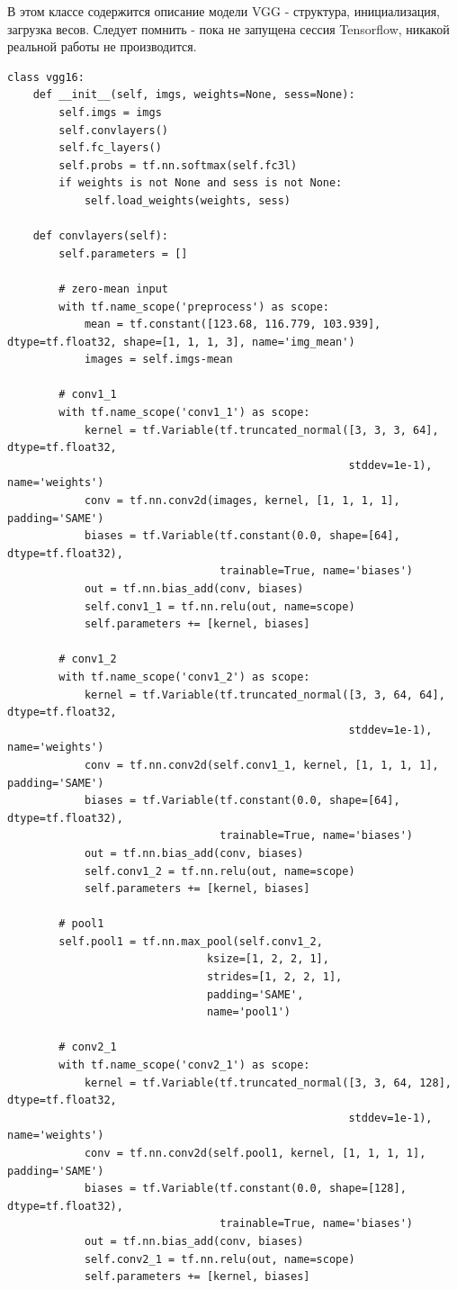 \documentclass[11pt,a4paper]{article}
\begin{document}
В этом классе содержится описание модели VGG - структура, инициализация, загрузка весов. Следует помнить - пока не запущена сессия Tensorflow, никакой реальной работы не производится.

\begin{verbatim}
class vgg16:
    def __init__(self, imgs, weights=None, sess=None):
        self.imgs = imgs
        self.convlayers()
        self.fc_layers()
        self.probs = tf.nn.softmax(self.fc3l)
        if weights is not None and sess is not None:
            self.load_weights(weights, sess)

    def convlayers(self):
        self.parameters = []

        # zero-mean input
        with tf.name_scope('preprocess') as scope:
            mean = tf.constant([123.68, 116.779, 103.939], dtype=tf.float32, shape=[1, 1, 1, 3], name='img_mean')
            images = self.imgs-mean

        # conv1_1
        with tf.name_scope('conv1_1') as scope:
            kernel = tf.Variable(tf.truncated_normal([3, 3, 3, 64], dtype=tf.float32,
                                                     stddev=1e-1), name='weights')
            conv = tf.nn.conv2d(images, kernel, [1, 1, 1, 1], padding='SAME')
            biases = tf.Variable(tf.constant(0.0, shape=[64], dtype=tf.float32),
                                 trainable=True, name='biases')
            out = tf.nn.bias_add(conv, biases)
            self.conv1_1 = tf.nn.relu(out, name=scope)
            self.parameters += [kernel, biases]

        # conv1_2
        with tf.name_scope('conv1_2') as scope:
            kernel = tf.Variable(tf.truncated_normal([3, 3, 64, 64], dtype=tf.float32,
                                                     stddev=1e-1), name='weights')
            conv = tf.nn.conv2d(self.conv1_1, kernel, [1, 1, 1, 1], padding='SAME')
            biases = tf.Variable(tf.constant(0.0, shape=[64], dtype=tf.float32),
                                 trainable=True, name='biases')
            out = tf.nn.bias_add(conv, biases)
            self.conv1_2 = tf.nn.relu(out, name=scope)
            self.parameters += [kernel, biases]

        # pool1
        self.pool1 = tf.nn.max_pool(self.conv1_2,
                               ksize=[1, 2, 2, 1],
                               strides=[1, 2, 2, 1],
                               padding='SAME',
                               name='pool1')

        # conv2_1
        with tf.name_scope('conv2_1') as scope:
            kernel = tf.Variable(tf.truncated_normal([3, 3, 64, 128], dtype=tf.float32,
                                                     stddev=1e-1), name='weights')
            conv = tf.nn.conv2d(self.pool1, kernel, [1, 1, 1, 1], padding='SAME')
            biases = tf.Variable(tf.constant(0.0, shape=[128], dtype=tf.float32),
                                 trainable=True, name='biases')
            out = tf.nn.bias_add(conv, biases)
            self.conv2_1 = tf.nn.relu(out, name=scope)
            self.parameters += [kernel, biases]


\end{verbatim}
\end{document}

